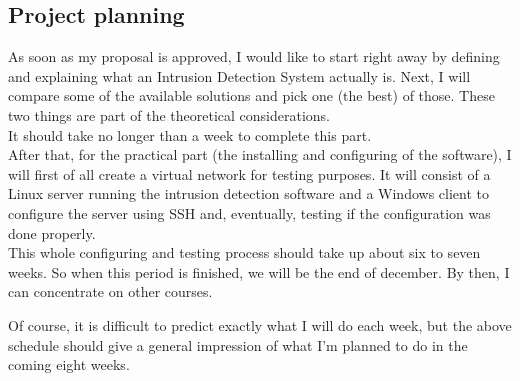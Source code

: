 \documentclass{article}
\begin{document}
\subsection*{Project planning}

As soon as my proposal is approved, I would like to start right away by defining and explaining what an Intrusion Detection System actually is. Next, I will compare some of the available solutions and pick one (the best) of those. These two things are part of the theoretical considerations.\\
It should take no longer than a week to complete this part. \\

After that, for the practical part (the installing and configuring of the software), I will first of all create a virtual network for testing purposes. It will consist of a Linux server running the intrusion detection software and a Windows client to configure the server using SSH and, eventually, testing if the configuration was done properly. \\


This whole configuring and testing process should take up about six to seven weeks. So when this period is finished, we will be the end of december. By then, I can concentrate on other courses.

Of course, it is difficult to predict exactly what I will do each week, but the above schedule should give a general impression of what I'm planned to do in the coming eight weeks.
\end{document}
